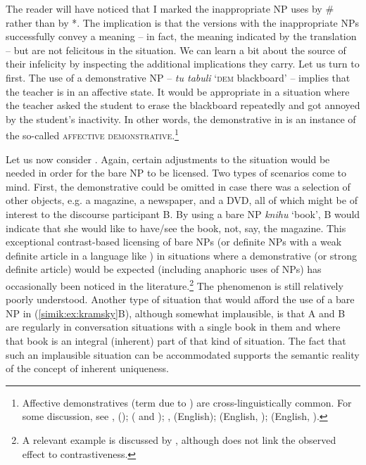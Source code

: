 \documentclass[output=paper,colorlinks,citecolor=brown,newtxmath]{langscibook}
\begin{document}
The reader will have noticed that I marked the inappropriate NP uses by {\#} rather than by *. The implication is that the versions with the inappropriate NPs successfully convey a meaning -- in fact, the meaning indicated by the translation -- but are not felicitous in the situation. We can learn a bit about the source of their infelicity by inspecting the additional implications they carry. Let us turn to  first. The use of a demonstrative NP -- \textit{tu tabuli} `\textsc{dem} blackboard' -- implies that the teacher is in an affective state. It would be appropriate in a situation where the teacher asked the student to erase the blackboard repeatedly and got annoyed by the student's inactivity. In other words, the demonstrative in  is an instance of the so-called \textsc{affective demonstrative}.\footnote{Affective demonstratives (term due to \citealt{Liberman2008}) are cross-linguistically common. For some discussion, see \citet{Mathesius1926}, \citet{Simik2016} ();  ( and ); \citet{Lakoff1974}, \citet{Liberman2008} (English); \citet{Potts.Schwarz2010} (English, ); \citet{Davis.Potts2010} (English, ).}

Let us now consider . Again, certain adjustments to the situation would be needed in order for the bare NP to be licensed. Two types of scenarios come to mind. First, the demonstrative could be omitted in case there was a selection of other objects, e.g. a magazine, a newspaper, and a DVD, all of which might be of interest to the discourse participant B. By using a bare NP \textit{knihu} `book', B would indicate that she would like to have/see the book, not, say, the magazine. This exceptional contrast-based licensing of bare NPs (or definite NPs with a weak definite article in a language like ) in situations where a demonstrative (or strong definite article) would be expected (including anaphoric uses of NPs) has occasionally been noticed in the literature.\footnote{A relevant  example is discussed by \citet[p. 32, ex. (54)]{Schwarz2009}, although \citeauthor{Schwarz2009} does not link the observed effect to contrastiveness.} The phenomenon is still relatively poorly understood. Another type of situation that would afford the use of a bare NP in (\ref{simik:ex:kramsky}B), although somewhat implausible, is that A and B are regularly in conversation situations with a single book in them and where that book is an integral (inherent) part of that kind of situation. The fact that such an implausible situation can be accommodated supports the semantic reality of the concept of inherent uniqueness.
\end{document}
